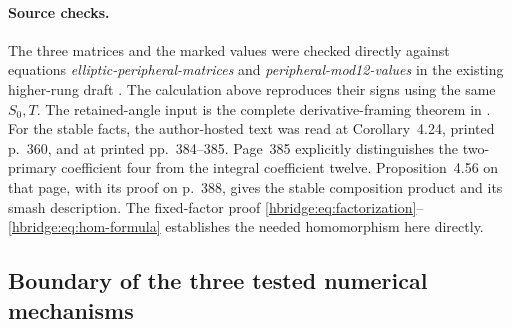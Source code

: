 \documentclass[11pt]{article}
\theoremstyle{definition}
\begin{document}
\paragraph{Source checks.}
The three matrices and the marked values were checked directly
against equations \emph{elliptic-peripheral-matrices} and
\emph{peripheral-mod12-values} in the existing higher-rung draft
\cite{hbridgebib:HBHigher}. The calculation above reproduces their signs
using the same \(S_0,T\). The retained-angle input is the
complete derivative-framing theorem in \cite{hbridgebib:HBRetained}.
For the stable facts, the author-hosted text
\cite{hbridgebib:HBHatcher} was read at Corollary~4.24, printed p.~360,
and at printed pp.~384--385. Page~385 explicitly distinguishes
the two-primary coefficient four from the integral coefficient
twelve. Proposition~4.56 on that page, with its proof on
p.~388, gives the stable composition product and its smash
description. The fixed-factor proof
\eqref{hbridge:eq:factorization}--\eqref{hbridge:eq:hom-formula}
establishes the needed homomorphism here directly.

\subsection{Boundary of the three tested numerical mechanisms}


\end{document}
